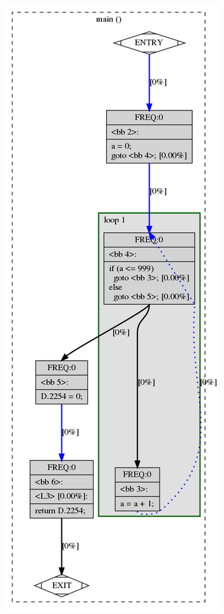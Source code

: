 \begin{multicols}{2}

\begin{center}
    \includegraphics[scale=0.32]{images/graph2.png}
\end{center}
\end{multicols}
